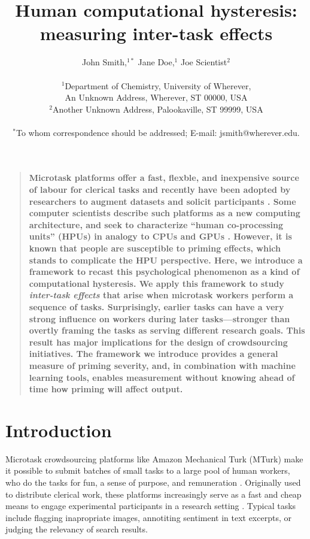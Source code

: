 \documentclass[12pt]{article}
\title{Human computational hysteresis: measuring inter-task effects}
\author
{John Smith,$^{1\ast}$ Jane Doe,$^{1}$ Joe Scientist$^{2}$\\
\\
\normalsize{$^{1}$Department of Chemistry, University of Wherever,}\\
\normalsize{An Unknown Address, Wherever, ST 00000, USA}\\
\normalsize{$^{2}$Another Unknown Address, Palookaville, ST 99999, USA}\\
\\
\normalsize{$^\ast$To whom correspondence should be addressed; E-mail:  jsmith@wherever.edu.}
}
\date{}
\newenvironment{sciabstract}{%
\begin{quote} \bf}
{\end{quote}}
\begin{document}
 


\baselineskip24pt


\maketitle 




\begin{sciabstract}
Microtask platforms offer a fast, flexble, and inexpensive source of labour for
clerical tasks \cite{Finnerty2013, chandler2013breaking, Berinsky2012351} and 
recently have been adopted by researchers to augment datasets and solicit 
participants \cite{paolacci2010running, Berinsky2012351, chandler2013breaking}.
Some computer scientists describe such platforms as a new computing 
architecture, and seek to characterize “human co-processing units” (HPUs) in 
analogy to CPUs and GPUs \cite{5543192}. However, it is known that people are 
susceptible to 
priming effects\cite{No2007,Swaab200299,Gopher2000308,sohn2001task,Ghuman17062008,BJOP1796,BJOP1826,Gass1999549}, which stands to complicate the HPU 
perspective.  Here, we introduce a framework to recast this psychological 
phenomenon as a kind of computational hysteresis. 
We apply this framework to study \textit{inter-task effects} that arise when 
microtask 
workers perform a sequence of tasks. Surprisingly, earlier tasks can have a 
very strong influence on workers during later tasks---stronger than overtly
framing the tasks as serving different research goals.   
This result has major implications for the design of crowdsourcing initiatives.
The framework we introduce provides a general measure of priming severity, 
and, in combination with machine learning tools, enables measurement without
knowing ahead of time how priming will affect output.
\end{sciabstract}

\section*{Introduction}
Microtask crowdsourcing platforms like Amazon Mechanical Turk (MTurk) make it 
possible to submit batches of small tasks to a large pool of human workers, 
who do the tasks for fun, a sense of purpose, and remuneration 
\cite{kazai2013analysis,Antin20122925}.  
Originally used to distribute clerical work, these platforms 
increasingly serve as a fast and cheap means to engage experimental 
participants in a research 
setting \cite{paolacci2010running,Berinsky2012351,snow2008cheap,alonso2009can}.
Typical tasks include flagging inapropriate images, annotiting sentiment in 
text excerpts, or judging the relevancy of search results.
\end{document}
